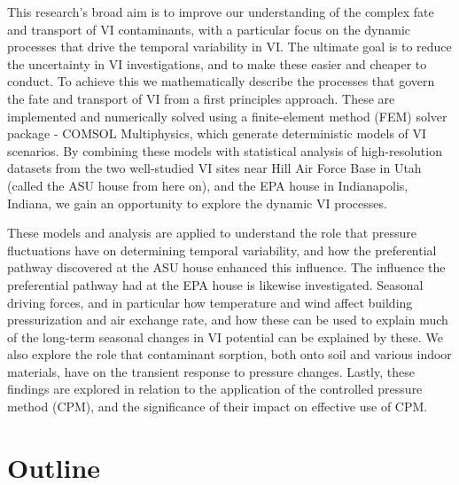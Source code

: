 \documentclass[../thesis.tex]{subfiles}
\begin{document}
This research's broad aim is to improve our understanding of the complex fate and transport of VI contaminants, with a particular focus on the dynamic processes that drive the temporal variability in VI.
The ultimate goal is to reduce the uncertainty in VI investigations, and to make these easier and cheaper to conduct.
To achieve this we mathematically describe the processes that govern the fate and transport of VI from a first principles approach.
These are implemented and numerically solved using a finite-element method (FEM) solver package - COMSOL Multiphysics, which generate deterministic models of VI scenarios.
By combining these models with statistical analysis of high-resolution datasets from the two well-studied VI sites near Hill Air Force Base in Utah (called the ASU house from here on), and the EPA house in Indianapolis, Indiana, we gain an opportunity to explore the dynamic VI processes.\par

These models and analysis are applied to understand the role that pressure fluctuations have on determining temporal variability, and how the preferential pathway discovered at the ASU house enhanced this influence.
The influence the preferential pathway had at the EPA house is likewise investigated.
Seasonal driving forces, and in particular how temperature and wind affect building pressurization and air exchange rate, and how these can be used to explain much of the long-term seasonal changes in VI potential can be explained by these.
We also explore the role that contaminant sorption, both onto soil and various indoor materials, have on the transient response to pressure changes.
Lastly, these findings are explored in relation to the application of the controlled pressure method (CPM), and the significance of their impact on effective use of CPM.\par

\section{Outline}
\end{document}
